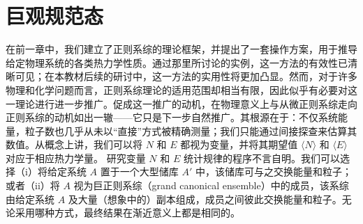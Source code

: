 ﻿\chapter{巨观规范态}\label{ux5de8ux89c2ux89c4ux8303ux6001}
在前一章中，我们建立了正则系综的理论框架，并提出了一套操作方案，用于推导给定物理系统的各类热力学性质。通过那里所讨论的实例，这一方法的有效性已清晰可见；在本教材后续的研讨中，这一方法的实用性将更加凸显。然而，对于许多物理和化学问题而言，正则系综理论的适用范围却相当有限，因此似乎有必要对这一理论进行进一步推广。促成这一推广的动机，在物理意义上与从微正则系综走向正则系综的动机如出一辙——它只是下一步自然推广。其根源在于：不仅系统能量，粒子数也几乎从未以“直接”方式被精确测量；我们只能通过间接探查来估算其数值。从概念上讲，我们可以将 \(N\) 和 \(E\) 都视为变量，并将其期望值 \(\langle N \rangle\) 和 \(\langle E \rangle\) 对应于相应热力学量。
研究变量 \(N\) 和 \(E\) 统计规律的程序不言自明。我们可以选择（i）将给定系统 \(A\) 置于一个大型储库 \(A'\) 中，该储库可与之交换能量和粒子；或者（ii）将 \(A\) 视为巨正则系综（grand canonical ensemble）中的成员，该系综由给定系统 \(A\) 及大量（想象中的）副本组成，成员之间彼此交换能量和粒子。无论采用哪种方式，最终结果在渐近意义上都是相同的。
